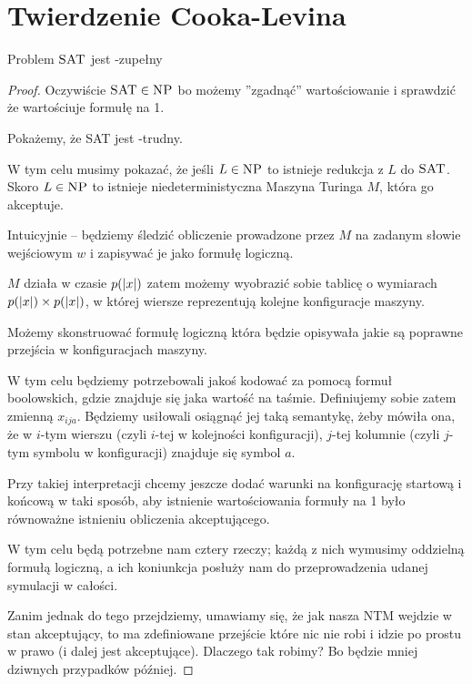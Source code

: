 \section{Twierdzenie Cooka-Levina}

\begin{theorem}
    Problem \( \textsc{SAT} \) jest \np-zupełny
\end{theorem}
\begin{proof}
    Oczywiście \( \textsc{SAT} \in \textsc{NP} \) bo możemy ''zgadnąć'' wartościowanie i sprawdzić że wartościuje formułę na 1.
    
    Pokażemy, że \textsc{SAT} jest \np-trudny.
    
    W tym celu musimy pokazać, że jeśli \( L \in \textsc{NP} \) to istnieje redukcja z \( L \) do \( \textsc{SAT} \).
    Skoro \( L \in \textsc{NP} \) to istnieje niedeterministyczna Maszyna Turinga \( M \), która go akceptuje. 
    
    Intuicyjnie -- będziemy śledzić obliczenie prowadzone przez \( M \) na zadanym słowie wejściowym \( w \) i zapisywać je jako formułę logiczną.
    
    \( M \) działa w czasie \( p(\left\lvert x\right\rvert) \) zatem możemy wyobrazić sobie tablicę o wymiarach \( p(\left\lvert x\right\rvert) \times p(\left\lvert x\right\rvert) \), w której wiersze reprezentują kolejne konfiguracje maszyny.

    Możemy skonstruować formułę logiczną która będzie opisywała jakie są poprawne przejścia w konfiguracjach maszyny.
    
    W tym celu będziemy potrzebowali jakoś kodować za pomocą formuł boolowskich, gdzie znajduje się jaka wartość na taśmie. Definiujemy sobie zatem zmienną \( x_{ija} \). Będziemy usiłowali osiągnąć jej taką semantykę, żeby mówiła ona, że w \(i\)-tym wierszu (czyli \(i\)-tej w kolejności konfiguracji), \(j\)-tej kolumnie (czyli \(j\)-tym symbolu w konfiguracji) znajduje się symbol \(a\). 
    
    Przy takiej interpretacji chcemy jeszcze dodać warunki na konfigurację startową i końcową w taki sposób, aby istnienie wartościowania formuły na 1 było równoważne istnieniu obliczenia akceptującego.
    
    W tym celu będą potrzebne nam cztery rzeczy; każdą z nich wymusimy oddzielną formułą logiczną, a ich koniunkcja posłuży nam do przeprowadzenia udanej symulacji w całości.
    
    Zanim jednak do tego przejdziemy, umawiamy się, że jak nasza NTM wejdzie w stan akceptujący, to ma zdefiniowane przejście które nic nie robi i idzie po prostu w prawo (i dalej jest akceptujące). Dlaczego tak robimy? Bo będzie mniej dziwnych przypadków później. 
    

\end{proof}
